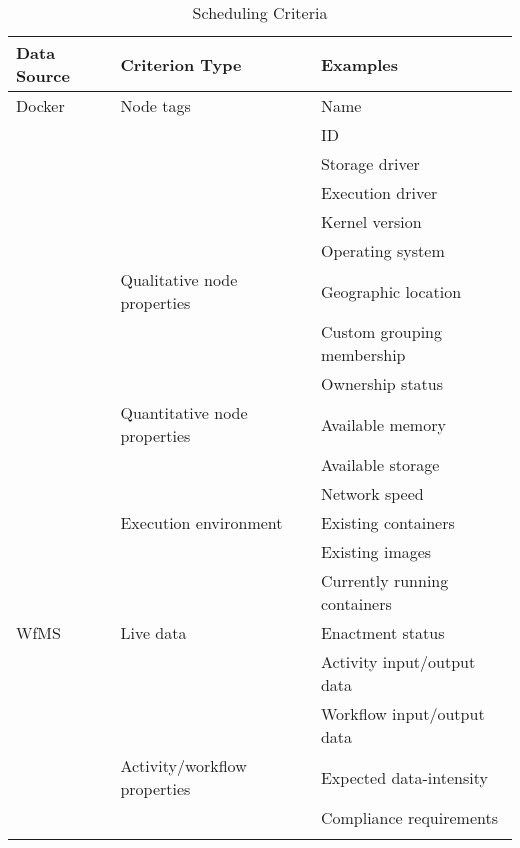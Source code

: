     \begin{table}[!htbp]
      \centering
      \begin{tabular}{l l l}
        \toprule
        Data Source & Criterion Type & Examples \\
        \midrule
        Docker
          & Node tags
            & Name \\
            && \ac{ID} \\
            && Storage driver \\
            && Execution driver \\
            && Kernel version  \\
            && Operating system \\ [1.2ex]
          & Qualitative node properties
            & Geographic location\\
            && Custom grouping membership\\
            && Ownership status\\ [1.2ex]
          & Quantitative node properties
            & Available memory \\
            && Available storage \\
            && Network speed \\ [1.2ex]
          & Execution environment
            & Existing containers \\
            && Existing images \\
            && Currently running containers \\ [1.4ex]
        WfMS
          & Live data
            & Enactment status \\
            && Activity input/output data \\
            && Workflow input/output data \\ [1.2ex]
          & Activity/workflow properties
            & Expected data-intensity \\
            && Compliance requirements\\
            &&\\ [1.2ex]
        \bottomrule
      \end{tabular}
      \label{tab:scheduling_criteria}
      \caption{Scheduling Criteria}
    \end{table}

